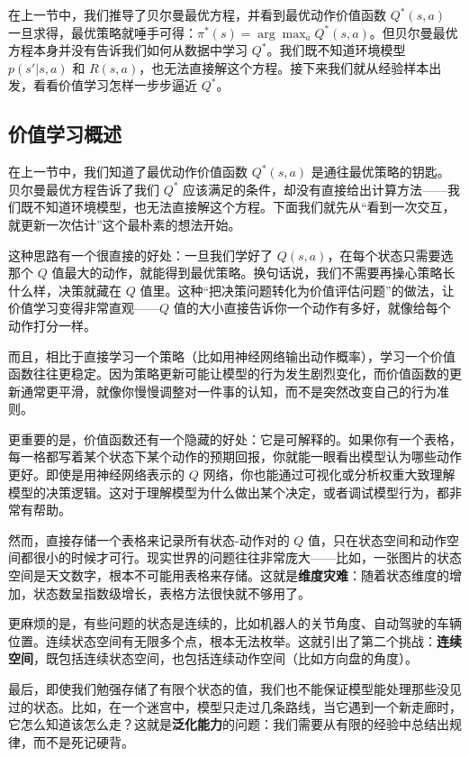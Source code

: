\documentclass[lang=cn,zihao=-4,a4paper,fontset=windows]{beautybook}
\begin{document}
在上一节中，我们推导了贝尔曼最优方程，并看到最优动作价值函数 \(Q^*(s,a)\) 一旦求得，最优策略就唾手可得：\(\pi^*(s) = \arg\max_a Q^*(s,a)\)。但贝尔曼最优方程本身并没有告诉我们如何从数据中学习 \(Q^*\)。我们既不知道环境模型 \(p(s'|s,a)\) 和 \(R(s,a)\)，也无法直接解这个方程。接下来我们就从经验样本出发，看看价值学习怎样一步步逼近 \(Q^*\)。

\subsection{价值学习概述}

在上一节中，我们知道了最优动作价值函数 \(Q^*(s,a)\) 是通往最优策略的钥匙。贝尔曼最优方程告诉了我们 \(Q^*\) 应该满足的条件，却没有直接给出计算方法——我们既不知道环境模型，也无法直接解这个方程。下面我们就先从“看到一次交互，就更新一次估计”这个最朴素的想法开始。

这种思路有一个很直接的好处：一旦我们学好了 \(Q(s,a)\)，在每个状态只需要选那个 \(Q\) 值最大的动作，就能得到最优策略。换句话说，我们不需要再操心策略长什么样，决策就藏在 \(Q\) 值里。这种“把决策问题转化为价值评估问题”的做法，让价值学习变得非常直观——\(Q\) 值的大小直接告诉你一个动作有多好，就像给每个动作打分一样。

而且，相比于直接学习一个策略（比如用神经网络输出动作概率），学习一个价值函数往往更稳定。因为策略更新可能让模型的行为发生剧烈变化，而价值函数的更新通常更平滑，就像你慢慢调整对一件事的认知，而不是突然改变自己的行为准则。

更重要的是，价值函数还有一个隐藏的好处：它是可解释的。如果你有一个表格，每一格都写着某个状态下某个动作的预期回报，你就能一眼看出模型认为哪些动作更好。即使是用神经网络表示的 \(Q\) 网络，你也能通过可视化或分析权重大致理解模型的决策逻辑。这对于理解模型为什么做出某个决定，或者调试模型行为，都非常有帮助。

然而，直接存储一个表格来记录所有状态-动作对的 \(Q\) 值，只在状态空间和动作空间都很小的时候才可行。现实世界的问题往往非常庞大——比如，一张图片的状态空间是天文数字，根本不可能用表格来存储。这就是\textbf{维度灾难}：随着状态维度的增加，状态数呈指数级增长，表格方法很快就不够用了。

更麻烦的是，有些问题的状态是连续的，比如机器人的关节角度、自动驾驶的车辆位置。连续状态空间有无限多个点，根本无法枚举。这就引出了第二个挑战：\textbf{连续空间}，既包括连续状态空间，也包括连续动作空间（比如方向盘的角度）。

最后，即使我们勉强存储了有限个状态的值，我们也不能保证模型能处理那些没见过的状态。比如，在一个迷宫中，模型只走过几条路线，当它遇到一个新走廊时，它怎么知道该怎么走？这就是\textbf{泛化能力}的问题：我们需要从有限的经验中总结出规律，而不是死记硬背。
\end{document}
